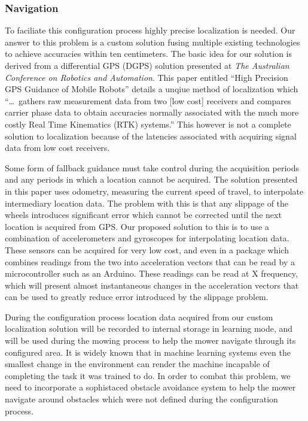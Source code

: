 \documentclass[12pt,letterpaper]{article}
\begin{document}
\subsubsection{Navigation}

To faciliate this configuration process highly precise localization is needed.
Our answer to this problem is a custom solution fusing multiple existing
technologies to achieve accuracies within ten centimeters.  The basic idea for
our solution is derived from a differential GPS (DGPS) solution presented at
\textit{The Australian Conference on Robotics and Automation}.  This paper
entitled ``High Precision GPS Guidance of Mobile Robots'' details a unqiue
method of localization which ``\ldots\ gathers raw measurement data from two
[low cost] receivers and compares carrier phase data to obtain accuracies
normally associated with the much more costly Real Time Kinematics (RTK)
systems.''\autocite{mobilegps}  This however is not a complete solution to
localization because of the latencies associated with acquiring signal data
from low cost receivers.  

Some form of fallback guidance must take control
during the acquisition periods and any periods in which a location cannot be
acquired.  The solution presented in this paper uses odometry, measuring the
current speed of travel, to interpolate intermediary location data.  The problem
with this is that any slippage of the wheels introduces significant error
which cannot be corrected until the next location is acquired from GPS.
Our proposed solution to this is to use a combination of accelerometers and
gyroscopes for interpolating location data.  These sensors can be acquired for
very low cost, and even in a package which combines readings from the two into
acceleration vectors that can be read by a microcontroller such as an Arduino. 
These readings can be read at X frequency, which will present almost
instantaneous changes in the acceleration vectors that can be used to greatly
reduce error introduced by the slippage problem.
  
During the configuration process location data acquired from our custom
localization solution will be recorded to internal storage in learning mode, and
will be used during the mowing process to help the mower navigate through its
configured area.  It is widely known that in machine learning systems even the
smallest change in the environment can render the machine incapable of
completing the task it was trained to do.  In order to combat this problem, we
need to incorporate a sophistaced obstacle avoidance system to help the mower
navigate around obstacles which were not defined during the configuration
process.
\end{document}
